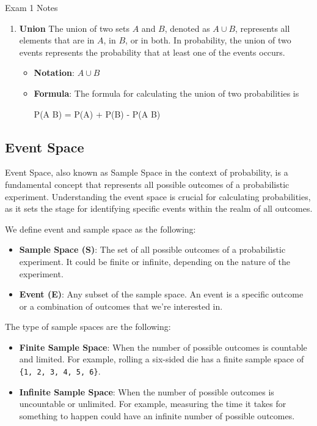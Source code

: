 \begin{examnotes}{Exam 1 Notes}
\begin{enumerate}
\begin{itemize}
\begin{itemize}
            \end{itemize}
        \end{itemize}
        \item \textbf{Union} The union of two sets $A$ and $B$, denoted as $A \cup B$, represents all elements that are in $A$, in $B$, or in both. In probability, the union of two events represents 
        the probability that at least one of the events occurs.
        \begin{itemize}
            \item \textbf{Notation}: $A \cup B$
            \item \textbf{Formula}: The formula for calculating the union of two probabilities is
            \begin{center}
                \begin{highlightbox}
                    P(A \cup B) = P(A) + P(B) - P(A \cap B)
                \end{highlightbox}
            \end{center}
        \end{itemize}
    \end{enumerate}

    \subsection*{Event Space}

    Event Space, also known as Sample Space in the context of probability, is a fundamental concept that represents all possible outcomes of a probabilistic experiment. Understanding the event space 
    is crucial for calculating probabilities, as it sets the stage for identifying specific events within the realm of all outcomes.

    We define event and sample space as the following:
    \begin{itemize}
        \item \textbf{Sample Space (S)}: The set of all possible outcomes of a probabilistic experiment. It could be finite or infinite, depending on the nature of the experiment.
        \item \textbf{Event (E)}: Any subset of the sample space. An event is a specific outcome or a combination of outcomes that we're interested in.
    \end{itemize}

    The type of sample spaces are the following:
    \begin{itemize}
        \item \textbf{Finite Sample Space}: When the number of possible outcomes is countable and limited. For example, rolling a six-sided die has a finite sample space of \texttt{\{1, 2, 3, 4, 5, 6\}}.
        \item \textbf{Infinite Sample Space}: When the number of possible outcomes is uncountable or unlimited. For example, measuring the time it takes for something to happen could have an infinite 
        number of possible outcomes.
    \end{itemize}


\end{examnotes}
